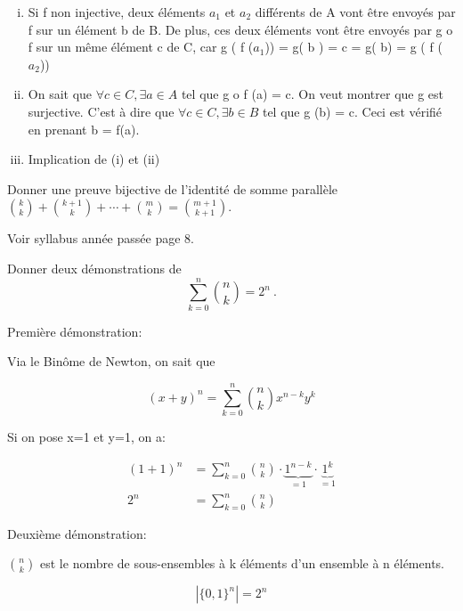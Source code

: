 \begin{enumerate}[(i)]
	\item Si f non injective, deux éléments $a_{1}$ et $a_{2}$ différents de A vont être envoyés par f sur un élément b de B. De plus, ces deux éléments vont être envoyés par g o f sur un même élément c de C, car g ( f ($a_1$)) = g( b ) = c = g( b) = g ( f ( $a_2$))
	\item On sait que $\forall c \in C , \exists a \in A$ tel que g o f (a) = c. 
		On veut montrer que g est surjective. C'est à dire que $\forall c \in C, \exists b \in B$ tel que g (b) = c. 
		Ceci est vérifié en prenant b = f(a).
	\item Implication de (i) et (ii)
\end{enumerate}


\begin{exo}
Donner une preuve bijective de l'identit\'e de somme parall\`ele ${k \choose k} + {k+1 \choose k} + \cdots + {m \choose k} = {m+1 \choose k+1}$.
\end{exo}

Voir syllabus année passée page 8.

\newpage


\begin{exo}
Donner deux d\'emonstrations de
\[
\sum_{k=0}^n {n \choose k} = 2^n\ .
\]
\end{exo}

Première démonstration: 

Via le Binôme de Newton, on sait que

\[(x+y)^n = \sum_{k=0}^n {n \choose k} x^{n-k} y^k\]

Si on pose x=1 et y=1, on a: 

\begin{align*}
 (1+1)^n &= \sum_{k=0}^n {n \choose k} \cdot \underbrace{1^{n-k}}_{=1} \cdot \underbrace{1^k}_{=1} \\
 2^n &= \sum_{k=0}^n {n \choose k}
\end{align*}

Deuxième démonstration: 

${n \choose k}$ est le nombre de sous-ensembles à k éléments d'un ensemble à n éléments. 

\[ |\{ 0,1 \}^n| = 2^n \]


